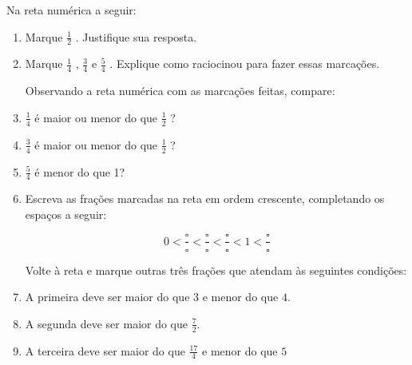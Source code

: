 Na reta numérica a seguir:
\begin{enumerate} [\quad a)] %
  \item     Marque     $\frac{1}{2}$    . Justifique sua resposta.
  \item     Marque     $\frac{1}{4}$    ,     $\frac{3}{4}$     e     $\frac{5}{4}$    . Explique como raciocinou para fazer essas marcações. 
  
\begin{center}
\end{center}

Observando a reta numérica com as marcações feitas, compare: 

  \item $\frac{1}{4}$     é maior ou menor do que     $\frac{1}{2}$    ? 
  \item $\frac{3}{4}$ é maior ou menor do que $\frac{1}{2}$    ?
  \item $\frac{5}{4}$  é menor do que 1?
  \item Escreva as frações marcadas na reta em ordem crescente, completando os espaços a seguir:

$$0 < \frac{\square}{\square} < \frac{\square}{\square}< \frac{\square}{\square} < 1 < \frac{\square}{\square}$$

Volte à reta e marque outras três frações que atendam às seguintes condições: 
  \item A primeira deve ser maior do que $3$ e menor do que $4$.
 \item A segunda deve ser maior do que $\frac{7}{2}$.
 \item A terceira deve ser maior do que $\frac{17}{4}$ e menor do que $5$

\end{enumerate} %




